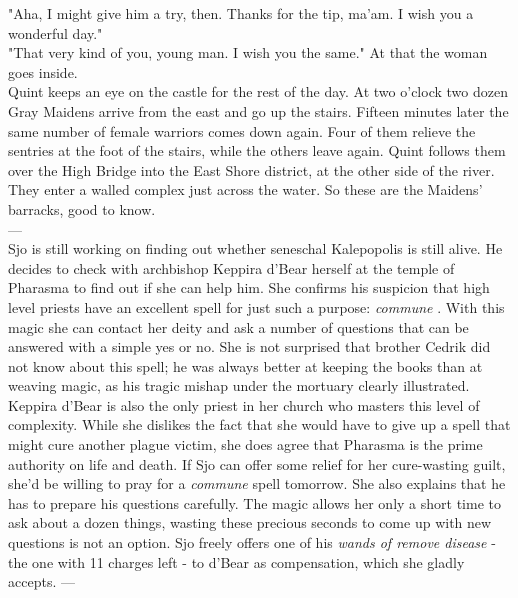 "Aha, I might give him a try, then. Thanks for the tip, ma'am. I wish you a wonderful day."\\

"That very kind of you, young man. I wish you the same." At that the woman goes inside.\\

Quint keeps an eye on the castle for the rest of the day. At two o'clock two dozen Gray Maidens arrive from the east and go up the stairs. Fifteen minutes later the same number of female warriors comes down again. Four of them relieve the sentries at the foot of the stairs, while the others leave again. Quint follows them over the High Bridge into the East Shore district, at the other side of the river. They enter a walled complex just across the water. So these are the Maidens' barracks, good to know.\\

---\\

Sjo is still working on finding out whether seneschal Kalepopolis is still alive. He decides to check with archbishop Keppira d'Bear herself at the temple of Pharasma to find out if she can help him. She confirms his suspicion that high level priests have an excellent spell for just such a purpose: {\itshape commune} . With this magic she can contact her deity and ask a number of questions that can be answered with a simple yes or no. She is not surprised that brother Cedrik did not know about this spell; he was always better at keeping the books than at weaving magic, as his tragic mishap under the mortuary clearly illustrated. Keppira d'Bear is also the only priest in her church who masters this level of complexity. While she dislikes the fact that she would have to give up a spell that might cure another plague victim, she does agree that Pharasma is the prime authority on life and death. If Sjo can offer some relief for her cure-wasting guilt, she'd be willing to pray for a  {\itshape commune} spell tomorrow. She also explains that he has to prepare his questions carefully. The magic allows her only a short time to ask about a dozen things, wasting these precious seconds to come up with new questions is not an option. Sjo freely offers one of his  {\itshape wands of remove disease} - the one with 11 charges left - to d'Bear as compensation, which she gladly accepts. ---\\

